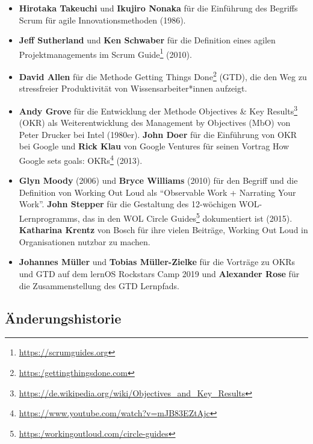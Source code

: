 \documentclass[
  ngerman,
  paper=a4,
,captions=tableheading
]{scrartcl}
\DeclareRobustCommand{\href}[2]{#2\footnote{\url{#1}}}
\providecommand{\tightlist}{%
  \setlength{\itemsep}{0pt}\setlength{\parskip}{0pt}}
\begin{document}
\begin{itemize}
\tightlist
\item
  \textbf{Hirotaka Takeuchi} und \textbf{Ikujiro Nonaka} für die
  Einführung des Begriffs Scrum für agile Innovationsmethoden (1986).
\item
  \textbf{Jeff Sutherland} und \textbf{Ken Schwaber} für die Definition
  eines agilen Projektmanagements im
  \href{https://scrumguides.org}{Scrum Guide} (2010).
\item
  \textbf{David Allen} für die Methode
  \href{https:/gettingthingsdone.com}{Getting Things Done} (GTD), die
  den Weg zu stressfreier Produktivität von Wissensarbeiter*innen
  aufzeigt.
\item
  \textbf{Andy Grove} für die Entwicklung der Methode
  \href{https://de.wikipedia.org/wiki/Objectives_and_Key_Results}{Objectives
  \& Key Results} (OKR) als Weiterentwicklung des Management by
  Objectives (MbO) von Peter Drucker bei Intel (1980er). \textbf{John
  Doer} für die Einführung von OKR bei Google und \textbf{Rick Klau} von
  Google Ventures für seinen Vortrag
  \href{https://www.youtube.com/watch?v=mJB83EZtAjc}{How Google sets
  goals: OKRs} (2013).
\item
  \textbf{Glyn Moody} (2006) und \textbf{Bryce Williams} (2010) für den
  Begriff und die Definition von Working Out Loud als ``Observable Work
  + Narrating Your Work''. \textbf{John Stepper} für die Gestaltung des
  12-wöchigen WOL-Lernprogramms, das in den
  \href{https:/workingoutloud.com/circle-guides}{WOL Circle Guides}
  dokumentiert ist (2015). \textbf{Katharina Krentz} von Bosch für ihre
  vielen Beiträge, Working Out Loud in Organisationen nutzbar zu machen.
\item
  \textbf{Johannes Müller} und \textbf{Tobias Müller-Zielke} für die
  Vorträge zu OKRs und GTD auf dem lernOS Rockstars Camp 2019 und
  \textbf{Alexander Rose} für die Zusammenstellung des GTD Lernpfads.
\end{itemize}

\hypertarget{uxe4nderungshistorie}{%
\subsection{Änderungshistorie}\label{uxe4nderungshistorie}}
\end{document}
